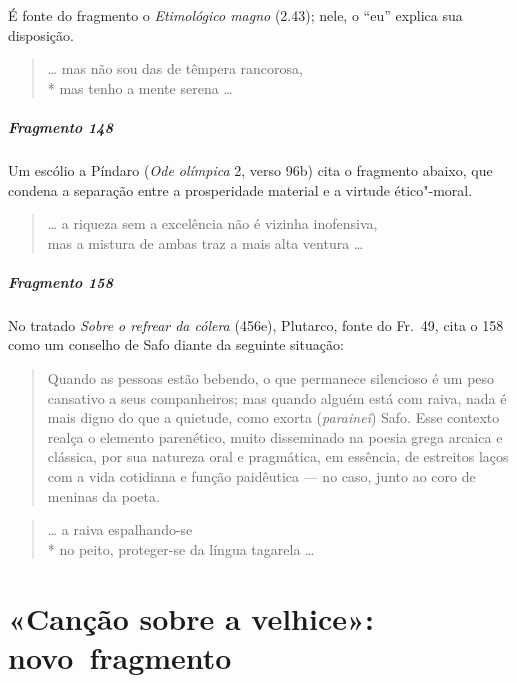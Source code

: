 {{\small É fonte do fragmento o \textit{Etimológico magno} (2.43); nele, o “eu”
explica sua disposição.}

\begin{verse}
\ldots{} mas não sou das de têmpera rancorosa,\\*
mas tenho a mente serena \ldots{}
\end{verse}

\paragraph{Fragmento 148}

{\small Um escólio a Píndaro (\textit{Ode olímpica} 2, verso 96b) cita o fragmento abaixo,
que condena a separação entre a prosperidade material e a virtude ético"-moral.}

\begin{verse}
\ldots{} a riqueza sem a excelência não é vizinha \qb{}inofensiva,\\
mas a mistura de ambas traz a mais alta ventura \ldots{}
\end{verse}

\paragraph{Fragmento 158}

{\small No tratado \textit{Sobre o refrear da cólera} (456e), Plutarco, fonte do Fr.~49, cita o 158 como um conselho de Safo diante da seguinte situação:

\begin{quote}
Quando as pessoas estão bebendo, o que permanece silencioso é um peso
cansativo a seus companheiros; mas quando alguém está com raiva, nada é mais
digno do que a quietude, como exorta (\textit{paraineî}) Safo. Esse contexto realça o elemento parenético, muito disseminado na poesia grega arcaica e clássica, por sua natureza oral e pragmática, em essência, de estreitos laços com a vida cotidiana e função paidêutica --- no caso, junto ao coro de meninas da poeta.
\end{quote}}

\begin{verse}
\ldots{} a raiva espalhando-se \\*
no peito, proteger-se da língua tagarela \ldots{}
\end{verse}

\chapter{«Canção sobre a velhice»: novo~fragmento}

}
